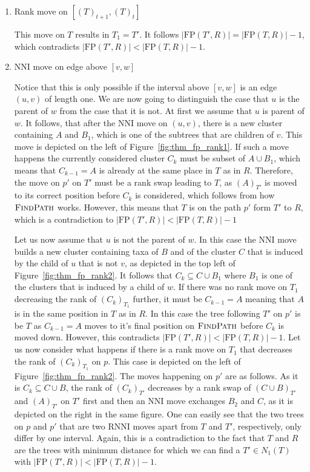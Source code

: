 \documentclass{amsart}
\newcommand{\rnni}{\mathrm{RNNI}}
\newcommand{\findpath}{\textsc{FindPath}}
\newcommand{\nni}{\mathrm{NNI}}
\newcommand{\fp}{\mathrm{FP}}
\begin{document}
\begin{enumerate}[label = 2.\arabic*]
\item Rank move on $[(T)_{t+1},(T)_t]$

This move on $T$ results in $T_1 = T'$.
It follows $|\fp(T',R)| = |\fp(T,R)| - 1$, which contradicts $|\fp(T',R)| < |\fp(T,R)| - 1$.

\item $\nni$ move on edge above $[v,w]$

Notice that this is only possible if the interval above $[v,w]$ is an edge $(u,v)$ of length one.
We are now going to distinguish the case that $u$ is the parent of $w$ from the case that it is not.
At first we assume that $u$ is parent of $w$.
It follows, that after the $\nni$ move on $(u,v)$, there is a new cluster containing $A$ and $B_1$, which is one of the subtrees that are children of $v$.
This move is depicted on the left of Figure~\ref{fig:thm_fp_rank1}.
If such a move happens the currently considered cluster $C_k$ must be subset of $A \cup B_1$, which means that $C_{k-1} = A$ is already at the same place in $T$ as in $R$.
Therefore, the move on $p'$ on $T'$ must be a rank swap leading to $T$, as $(A)_{T'}$ is moved to its correct position before $C_k$ is considered, which follows from how $\findpath$ works.
However, this means that $T$ is on the path $p'$ form $T'$ to $R$, which is a contradiction to $|\fp(T',R)| < |\fp(T,R)| - 1$

Let us now assume that $u$ is not the parent of $w$.
In this case the $\nni$ move builds a new cluster containing taxa of $B$ and of the cluster $C$ that is induced by the child of $u$ that is not $v$, as depicted in the top left of Figure~\ref{fig:thm_fp_rank2}.
It follows that $C_k \subseteq C \cup B_1$ where $B_1$ is one of the clusters that is induced by a child of $w$.
If there was no rank move on $T_1$ decreasing the rank of $(C_k)_{T_1}$ further, it must be $C_{k-1} = A$ meaning that $A$ is in the same position in $T$ as in $R$.
In this case the tree following $T'$ on $p'$ is be $T$ as $C_{k-1} = A$ moves to it's final position on $\findpath$ before $C_k$ is moved down.
However, this contradicts $|\fp(T',R)| < |\fp(T,R)| - 1$.
Let us now consider what happens if there is a rank move on $T_1$ that decreases the rank of $(C_k)_{T_1}$ on $p$.
This case is depicted on the left of Figure~\ref{fig:thm_fp_rank2}.
The moves happening on $p'$ are as follows.
As it is $C_k \subseteq C \cup B$, the rank of $(C_k)_{T'}$ decreases by a rank swap of $(C \cup B)_{T'}$ and $(A)_{T'}$ on $T'$ first and then an $\nni$ move exchanges $B_2$ and $C$, as it is depicted on the right in the same figure.
One can easily see that the two trees on $p$ and $p'$ that are two $\rnni$ moves apart from $T$ and $T'$, respectively, only differ by one interval.
Again, this is a contradiction to the fact that $T$ and $R$ are the trees with minimum distance for which we can find a $T' \in N_1(T)$ with $|\fp(T',R)| < |\fp(T,R)| - 1$.


\end{enumerate}
\end{document}

